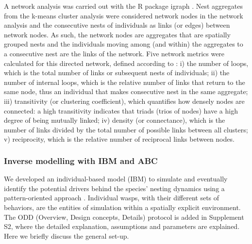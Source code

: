 \documentclass[10pt, twoside]{book} %
\begin{document}
	A network analysis was carried out with the R package igraph \citep{csardi2006}. Nest aggregates from the k-means cluster analysis were considered network nodes in the network analysis and the consecutive nests of individuals as links (or edges) between network nodes. As such, the network nodes are aggregates that are spatially grouped nests and the individuals moving among (and within) the aggregates to a consecutive nest are the links of the network. Five network metrics were calculated for this directed network, defined according to \citet{farine2015}: i) the number of loops, which is the total number of links or subsequent nests of individuals; ii) the number of internal loops, which is the relative number of links that return to the same node, thus an individual that makes consecutive nest in the same aggregate; iii) transitivity (or clustering coefficient), which quantifies how densely nodes are connected: a high transitivity indicates that triads (trios of nodes) have a high degree of being mutually linked; iv) density (or connectance), which is the number of links divided by the total number of possible links between all clusters; v) reciprocity, which is the relative number of reciprocal links between nodes.\\
	

	\subsubsection{Inverse modelling with IBM and ABC}\label{InvMod}
	We developed an individual-based model (IBM) to simulate and eventually identify the potential drivers behind the species' nesting dynamics using a pattern-oriented approach \citep{grimm2005}. Individual wasps, with their different sets of behaviors, are the entities of simulation within a spatially explicit environment. The ODD (Overview, Design concepts, Details) protocol \citep{grimm2006, grimm2010} is added in Supplement S2, where the detailed explanation, assumptions and parameters are explained. Here we briefly discuss the general set-up.\\
	
\end{document}
